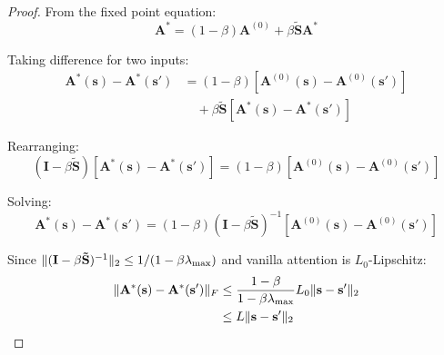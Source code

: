 \documentclass[11pt]{article}
\newtheorem{proof}{Proof}
\DeclarePairedDelimiter{\norm}{\lVert}{\rVert}
\begin{document}
\begin{proof}
From the fixed point equation:
\begin{equation}
    \mathbf{A}^* = (1-\beta) \mathbf{A}^{(0)} + \beta \mathbf{\tilde{S}} \mathbf{A}^*
\end{equation}

Taking difference for two inputs:
\begin{align}
    \mathbf{A}^*(\mathbf{s}) - \mathbf{A}^*(\mathbf{s}') &= (1-\beta)[\mathbf{A}^{(0)}(\mathbf{s}) - \mathbf{A}^{(0)}(\mathbf{s}')] \\
    &\quad + \beta \mathbf{\tilde{S}} [\mathbf{A}^*(\mathbf{s}) - \mathbf{A}^*(\mathbf{s}')]
\end{align}

Rearranging:
\begin{equation}
    (\mathbf{I} - \beta \mathbf{\tilde{S}})[\mathbf{A}^*(\mathbf{s}) - \mathbf{A}^*(\mathbf{s}')] = (1-\beta)[\mathbf{A}^{(0)}(\mathbf{s}) - \mathbf{A}^{(0)}(\mathbf{s}')]
\end{equation}

Solving:
\begin{equation}
    \mathbf{A}^*(\mathbf{s}) - \mathbf{A}^*(\mathbf{s}') = (1-\beta)(\mathbf{I} - \beta \mathbf{\tilde{S}})^{-1} [\mathbf{A}^{(0)}(\mathbf{s}) - \mathbf{A}^{(0)}(\mathbf{s}')]
\end{equation}

Since $\norm{(\mathbf{I} - \beta \mathbf{\tilde{S}})^{-1}}_2 \leq 1/(1-\beta\lambda_{\max})$ and vanilla attention is $L_0$-Lipschitz:
\begin{align}
    \norm{\mathbf{A}^*(\mathbf{s}) - \mathbf{A}^*(\mathbf{s}')}_F &\leq \frac{1-\beta}{1-\beta\lambda_{\max}} L_0 \norm{\mathbf{s} - \mathbf{s}'}_2 \\
    &\leq L \norm{\mathbf{s} - \mathbf{s}'}_2
\end{align}
\end{proof}
\end{document}
